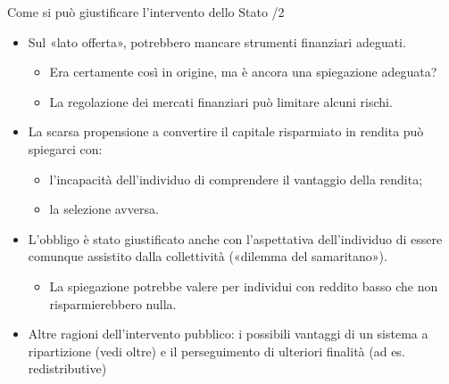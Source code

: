 \documentclass[aspectratio=64,12pt]{beamer}
\begin{document}
\begin{frame}{Come si può giustificare l'intervento dello Stato /2}
\begin{itemize}
\item Sul «lato offerta», potrebbero mancare strumenti
finanziari adeguati.
\begin{itemize}
\item Era certamente così in origine, ma è ancora una spiegazione adeguata?
\item La regolazione dei mercati finanziari può limitare alcuni rischi.
\end{itemize}
\item La scarsa propensione a convertire il capitale risparmiato in rendita può
spiegarci con:
\begin{itemize}
\item l'incapacità dell'individuo di comprendere il vantaggio della rendita;
\item la \alert{selezione avversa}.
\end{itemize}
\item L'obbligo è stato giustificato anche con l'aspettativa dell'individuo di
essere comunque assistito dalla collettività («dilemma del samaritano»).
\begin{itemize}
\item La spiegazione potrebbe valere per individui con reddito basso che non
risparmierebbero nulla.
\end{itemize}
\item Altre ragioni dell'intervento pubblico: i possibili vantaggi di un
  sistema a ripartizione (vedi oltre) e il perseguimento di ulteriori finalità
  (ad es. redistributive)
\end{itemize}
\end{frame}
\end{document}
